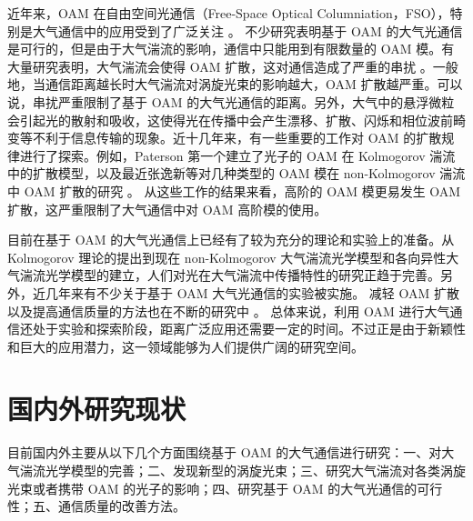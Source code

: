 \documentclass[master]{thesis-uestc}
\begin{document}
近年来，OAM 在自由空间光通信（Free-Space Optical Columniation，FSO），特别是大气通信中的应用受到了广泛关注     。 不少研究表明基于 OAM 的大气光通信是可行的，但是由于大气湍流的影响，通信中只能用到有限数量的 OAM 模。有大量研究表明，大气湍流会使得 OAM 扩散，这对通信造成了严重的串扰 。一般地，当通信距离越长时大气湍流对涡旋光束的影响越大，OAM 扩散越严重。可以说，串扰严重限制了基于 OAM 的大气光通信的距离。另外，大气中的悬浮微粒会引起光的散射和吸收，这使得光在传播中会产生漂移、扩散、闪烁和相位波前畸变等不利于信息传输的现象。近十几年来，有一些重要的工作对 OAM 的扩散规律进行了探索。例如，Paterson 第一个建立了光子的 OAM 在 Kolmogorov 湍流中的扩散模型，以及最近张逸新等对几种类型的 OAM 模在 non-Kolmogorov 湍流中 OAM 扩散的研究 。 从这些工作的结果来看，高阶的 OAM 模更易发生 OAM 扩散，这严重限制了大气通信中对 OAM 高阶模的使用。

目前在基于 OAM 的大气光通信上已经有了较为充分的理论和实验上的准备。从 Kolmogorov 理论的提出到现在 non-Kolmogorov 大气湍流光学模型和各向异性大气湍流光学模型的建立，人们对光在大气湍流中传播特性的研究正趋于完善。另外，近几年来有不少关于基于 OAM 大气光通信的实验被实施。 减轻 OAM 扩散以及提高通信质量的方法也在不断的研究中 。 总体来说，利用 OAM 进行大气通信还处于实验和探索阶段，距离广泛应用还需要一定的时间。不过正是由于新颖性和巨大的应用潜力，这一领域能够为人们提供广阔的研究空间。

\section{国内外研究现状}
目前国内外主要从以下几个方面围绕基于 OAM 的大气通信进行研究：一、对大气湍流光学模型的完善；二、发现新型的涡旋光束；三、研究大气湍流对各类涡旋光束或者携带 OAM 的光子的影响；四、研究基于 OAM 的大气光通信的可行性；五、通信质量的改善方法。
\end{document}
